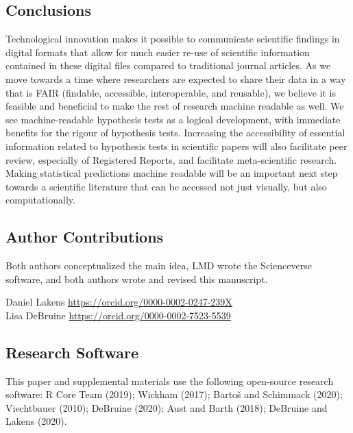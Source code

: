 \documentclass[
  english,
  doc,floatsintext]{apa6}
\begin{document}
\hypertarget{conclusions}{%
\subsection{Conclusions}\label{conclusions}}

Technological innovation makes it possible to communicate scientific findings in digital formats that allow for much easier re-use of scientific information contained in these digital files compared to traditional journal articles. As we move towards a time where researchers are expected to share their data in a way that is FAIR (findable, accessible, interoperable, and reusable), we believe it is feasible and beneficial to make the rest of research machine readable as well. We see machine-readable hypothesis tests as a logical development, with immediate benefits for the rigour of hypothesis tests. Increasing the accessibility of essential information related to hypothesis tests in scientific papers will also facilitate peer review, especially of Registered Reports, and facilitate meta-scientific research. Making statistical predictions machine readable will be an important next step towards a scientific literature that can be accessed not just visually, but also computationally.

\newpage

\hypertarget{author-contributions}{%
\subsection{Author Contributions}\label{author-contributions}}

Both authors conceptualized the main idea, LMD wrote the Scienceverse software, and both authors wrote and revised this manuscript.

Daniel Lakens \url{https://orcid.org/0000-0002-0247-239X}\\
Lisa DeBruine \url{https://orcid.org/0000-0002-7523-5539}

\hypertarget{research-software}{%
\subsection{Research Software}\label{research-software}}

This paper and supplemental materials use the following open-source research software: R Core Team (2019); Wickham (2017); Bartoš and Schimmack (2020); Viechtbauer (2010); DeBruine (2020); Aust and Barth (2018); DeBruine and Lakens (2020).
\end{document}
